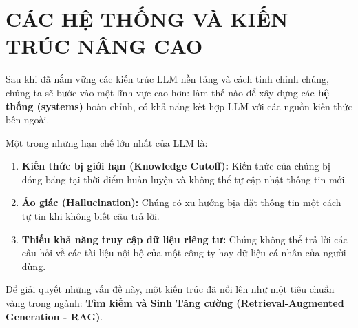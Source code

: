 \chapter{CÁC HỆ THỐNG VÀ KIẾN TRÚC NÂNG CAO}
\label{chap:advanced_architectures}

Sau khi đã nắm vững các kiến trúc LLM nền tảng và cách tinh chỉnh chúng, chúng ta sẽ bước vào một lĩnh vực cao hơn: làm thế nào để xây dựng các \textbf{hệ thống (systems)} hoàn chỉnh, có khả năng kết hợp LLM với các nguồn kiến thức bên ngoài.

Một trong những hạn chế lớn nhất của LLM là:
\begin{enumerate}
    \item \textbf{Kiến thức bị giới hạn (Knowledge Cutoff):} Kiến thức của chúng bị đóng băng tại thời điểm huấn luyện và không thể tự cập nhật thông tin mới.
    \item \textbf{Ảo giác (Hallucination):} Chúng có xu hướng bịa đặt thông tin một cách tự tin khi không biết câu trả lời.
    \item \textbf{Thiếu khả năng truy cập dữ liệu riêng tư:} Chúng không thể trả lời các câu hỏi về các tài liệu nội bộ của một công ty hay dữ liệu cá nhân của người dùng.
\end{enumerate}

Để giải quyết những vấn đề này, một kiến trúc đã nổi lên như một tiêu chuẩn vàng trong ngành: \textbf{Tìm kiếm và Sinh Tăng cường (Retrieval-Augmented Generation - RAG)}.